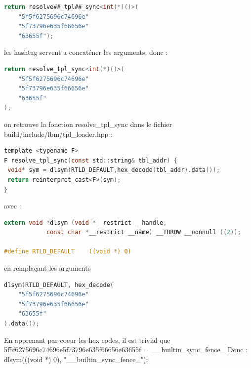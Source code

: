 \begin{minipage}{0.48\textwidth}
\begin{lstlisting}[language=C]
return resolve##_tpl##_sync<int(*)()>(
    "5f5f6275696c74696e"
    "5f73796e635f66656e"
    "63655f");
\end{lstlisting}
\end{minipage}

les hashtag servent a concaténer les arguments, donc :

\begin{minipage}{0.28\textwidth}
\begin{lstlisting}[language=C]
return resolve_tpl_sync<int(*)()>(
    "5f5f6275696c74696e"
    "5f73796e635f66656e"
    "63655f"
);
\end{lstlisting}
\end{minipage}

on retrouve la fonction resolve\_tpl\_sync dans le fichier build/include/lbm/tpl\_loader.hpp :

\begin{minipage}{0.48\textwidth}
\begin{lstlisting}[language=C]
template <typename F>
F resolve_tpl_sync(const std::string& tbl_addr) {
 void* sym = dlsym(RTLD_DEFAULT,hex_decode(tbl_addr).data());
 return reinterpret_cast<F>(sym);
}
\end{lstlisting}
\end{minipage}

avec :

\begin{minipage}{0.48\textwidth}
\begin{lstlisting}[language=C]
extern void *dlsym (void *__restrict __handle,
		    const char *__restrict __name) __THROW __nonnull ((2));

#define RTLD_DEFAULT	((void *) 0)
\end{lstlisting}
\end{minipage}

en remplaçant les arguments

\begin{minipage}{0.48\textwidth}
\begin{lstlisting}[language=C]
dlsym(RTLD_DEFAULT, hex_decode(
    "5f5f6275696c74696e"
    "5f73796e635f66656e"
    "63655f"
).data());
\end{lstlisting}
\end{minipage}

En apprenant par coeur les hex codes, il est trivial que 
5f5f6275696c74696e5f73796e635f66656e63655f = \_\_builtin\_sync\_fence\_
Donc :
dlsym(((void *) 0), "\_\_builtin\_sync\_fence\_");

